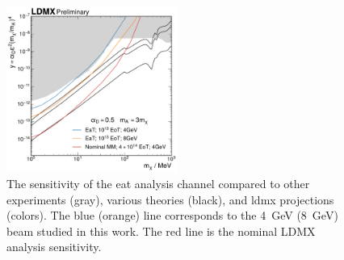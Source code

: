 \begin{figure}
  \centering
  \includegraphics[width=0.5\textwidth]{figures/ldmx/analysis/reach.pdf}
  \caption{%
    The sensitivity of the \ac{eat} analysis channel compared to
    other experiments (gray), various theories (black), and \ac{ldmx} projections (colors).
    The blue (orange) line corresponds to the \qty{4}{\GeV} (\qty{8}{\GeV}) beam studied in this work.
    The red line is the nominal LDMX analysis sensitivity.
  }
  \label{fig:reach}
\end{figure}
